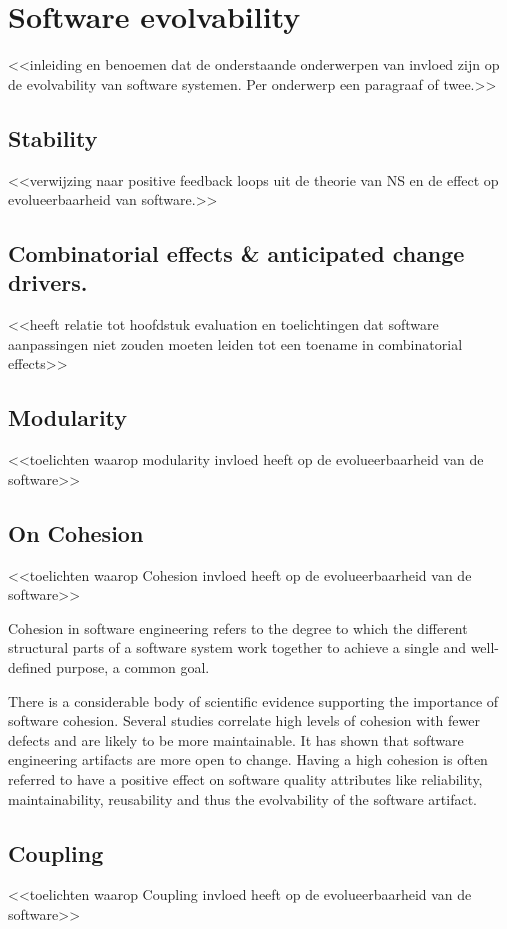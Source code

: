 \section{Software evolvability} \label{software_evolvability}

<<inleiding en benoemen dat de onderstaande onderwerpen van invloed zijn op de
evolvability van software systemen. Per onderwerp een paragraaf of twee.>>

\subsection{Stability}
<<verwijzing naar positive feedback loops uit de theorie van NS en de effect op
evolueerbaarheid van software.>>

\subsection{Combinatorial effects \& anticipated change drivers.}
<<heeft relatie tot hoofdstuk evaluation en toelichtingen dat software aanpassingen niet
zouden moeten leiden tot een toename in combinatorial effects>>

\subsection{Modularity}
<<toelichten waarop modularity invloed heeft op de evolueerbaarheid van de software>>

\subsection{On Cohesion}
<<toelichten waarop Cohesion invloed heeft op de evolueerbaarheid van de software>>

Cohesion in software engineering refers to the degree to which the different structural
parts of a software system work together to achieve a single and well-defined purpose, a
common goal. 

There is a considerable body of scientific evidence supporting the importance of software
cohesion. Several studies correlate high levels of cohesion with fewer defects and are
likely to be more maintainable. It has shown that software engineering artifacts are more
open to change. Having a high cohesion is often referred to have a positive effect on
software quality attributes like reliability, maintainability, reusability and thus the
evolvability of the software artifact. 

\subsection{Coupling}
<<toelichten waarop Coupling invloed heeft op de evolueerbaarheid van de software>>